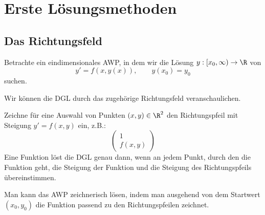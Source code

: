 \documentclass[
]{mycourse}
\begin{document}
\section{Erste Lösungsmethoden}


\subsection{Das Richtungsfeld}


Betrachte ein eindimensionales AWP, in dem wir die Lösung $y: [x_0,\infty) \to \R$ von
\[
	y' = f(x,y(x)) , \qquad y(x_0) = y_0
\]
suchen.


Wir können die DGL durch das zugehörige Richtungsfeld veranschaulichen.

Zeichne für eine Auswahl von Punkten $(x,y) \in \R^2$ den Richtungspfeil mit Steigung $y'=f(x,y)$ ein, z.B.:
\[
	\begin{pmatrix}
		1 \\
		f(x,y)
	\end{pmatrix}
\]
Eine Funktion löst die DGL genau dann, wenn an jedem Punkt, durch den die Funktion geht, die Steigung der Funktion und die Steigung des Richtungspfeils übereinstimmen.

Man kann das AWP zeichnerisch lösen, indem man ausgehend von dem Startwert $(x_0,y_0)$ die Funktion passend zu den Richtungspfeilen zeichnet.
\end{document}
